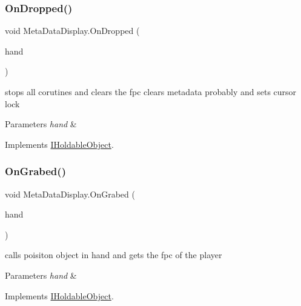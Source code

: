 \subsubsection{\texorpdfstring{On\+Dropped()}{OnDropped()}}
{\footnotesize\ttfamily void Meta\+Data\+Display.\+On\+Dropped (\begin{DoxyParamCaption}\item[{\mbox{\hyperlink{class_player_hand}{Player\+Hand}}}]{hand }\end{DoxyParamCaption})}



stops all corutines and clears the fpc clears metadata probably and sets cursor lock 


\begin{DoxyParams}{Parameters}
{\em hand} & \\
\hline
\end{DoxyParams}


Implements \mbox{\hyperlink{interface_i_holdable_object_a19523673c41505d8533aa50b957e95a1}{I\+Holdable\+Object}}.

\mbox{\label{class_meta_data_display_a7d639d7bc58c9340a7f5274884bbc11d}} 
\subsubsection{\texorpdfstring{On\+Grabed()}{OnGrabed()}}
{\footnotesize\ttfamily void Meta\+Data\+Display.\+On\+Grabed (\begin{DoxyParamCaption}\item[{\mbox{\hyperlink{class_player_hand}{Player\+Hand}}}]{hand }\end{DoxyParamCaption})}



calls poisiton object in hand and gets the fpc of the player 


\begin{DoxyParams}{Parameters}
{\em hand} & \\
\hline
\end{DoxyParams}


Implements \mbox{\hyperlink{interface_i_holdable_object_a7b8a42a0c12a26b1668c4dd904f38355}{I\+Holdable\+Object}}.

